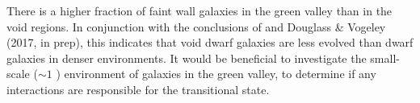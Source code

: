 There is a higher fraction of faint wall galaxies in the green valley than in 
the void regions.  In conjunction with the conclusions of \cite{Douglass17b} and 
Douglass \& Vogeley (2017, in prep), this indicates that void dwarf galaxies are 
less evolved than dwarf galaxies in denser environments.  It would be beneficial 
to investigate the small-scale ($\sim 1$ \hMpc) environment of galaxies in the 
green valley, to determine if any interactions are responsible for the 
transitional state.